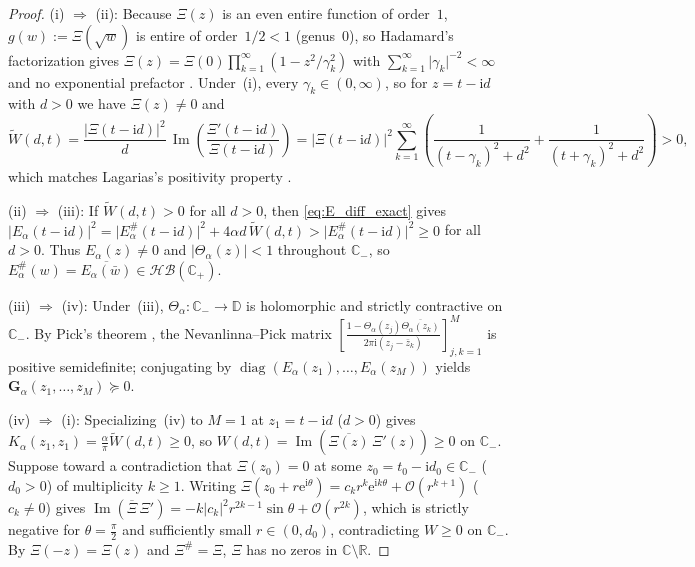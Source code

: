 \documentclass[11pt,reqno]{amsart}
\theoremstyle{definition}
\theoremstyle{remark}
\numberwithin{equation}{section}
\newcommand{\ii}{\mathrm{i}}
\newcommand{\ee}{\mathrm{e}}
\newcommand{\Ima}{\operatorname{Im}}
\begin{document}
\begin{proof}
\textup{(i) $\Rightarrow$ (ii):} Because $\Xi(z)$ is an even entire function of order~$1$, $g(w) := \Xi(\sqrt{w})$ is entire of order~$1/2 < 1$ (genus~$0$), so Hadamard's factorization gives $\Xi(z) = \Xi(0)\prod_{k=1}^\infty(1 - z^2/\gamma_k^2)$ with $\sum_{k=1}^\infty \lvert\gamma_k\rvert^{-2} < \infty$ and no exponential prefactor \cite[Section~2.12]{Titchmarsh1986}. Under~(i), every $\gamma_k \in (0,\infty)$, so for $z = t - \ii d$ with $d > 0$ we have $\Xi(z) \neq 0$ and
\begin{equation}\label{eq:hadamard_W}
  \widetilde{W}(d,t) = \frac{\lvert\Xi(t-\ii d)\rvert^2}{d}\,\Ima\!\left(\frac{\Xi'(t-\ii d)}{\Xi(t-\ii d)}\right)
  = \lvert\Xi(t-\ii d)\rvert^2 \sum_{k=1}^{\infty}\left(\frac{1}{(t-\gamma_k)^2 + d^2} + \frac{1}{(t+\gamma_k)^2 + d^2}\right) > 0,
\end{equation}
which matches Lagarias's positivity property \cite{Lagarias1999}.

\textup{(ii) $\Rightarrow$ (iii):} If $\widetilde{W}(d,t) > 0$ for all $d > 0$, then \eqref{eq:E_diff_exact} gives $\lvert E_\alpha(t-\ii d)\rvert^2 = \lvert E_\alpha^\#(t-\ii d)\rvert^2 + 4\alpha d\,\widetilde{W}(d,t) > \lvert E_\alpha^\#(t-\ii d)\rvert^2 \ge 0$ for all $d > 0$. Thus $E_\alpha(z) \neq 0$ and $\lvert\Theta_\alpha(z)\rvert < 1$ throughout $\mathbb{C}_-$, so $E_\alpha^\#(w) = \overline{E_\alpha(\bar{w})} \in \mathcal{HB}(\mathbb{C}_+)$.

\textup{(iii) $\Rightarrow$ (iv):} Under~(iii), $\Theta_\alpha : \mathbb{C}_- \to \mathbb{D}$ is holomorphic and strictly contractive on $\mathbb{C}_-$. By Pick's theorem \cite{Pick1916}, the Nevanlinna--Pick matrix $[\frac{1 - \Theta_\alpha(z_j)\overline{\Theta_\alpha(z_k)}}{2\pi\ii(z_j - \bar{z}_k)}]_{j,k=1}^M$ is positive semidefinite; conjugating by $\operatorname{diag}(E_\alpha(z_1),\dots,E_\alpha(z_M))$ yields $\mathbf{G}_\alpha(z_1,\dots,z_M) \succeq 0$.

\textup{(iv) $\Rightarrow$ (i):} Specializing~(iv) to $M = 1$ at $z_1 = t - \ii d$ ($d > 0$) gives $K_\alpha(z_1,z_1) = \frac{\alpha}{\pi}\widetilde{W}(d,t) \ge 0$, so $W(d,t) = \Ima(\overline{\Xi(z)}\,\Xi'(z)) \ge 0$ on $\mathbb{C}_-$. Suppose toward a contradiction that $\Xi(z_0) = 0$ at some $z_0 = t_0 - \ii d_0 \in \mathbb{C}_-$ ($d_0 > 0$) of multiplicity $k \ge 1$. Writing $\Xi(z_0 + r\ee^{\ii\theta}) = c_k r^k \ee^{\ii k\theta} + \mathcal{O}(r^{k+1})$ ($c_k \neq 0$) gives $\Ima(\overline{\Xi}\,\Xi') = -k\lvert c_k\rvert^2 r^{2k-1}\sin\theta + \mathcal{O}(r^{2k})$, which is strictly negative for $\theta = \frac{\pi}{2}$ and sufficiently small $r \in (0, d_0)$, contradicting $W \ge 0$ on $\mathbb{C}_-$. By $\Xi(-z) = \Xi(z)$ and $\Xi^\# = \Xi$, $\Xi$ has no zeros in $\mathbb{C}\setminus\mathbb{R}$.
\end{proof}
\end{document}
